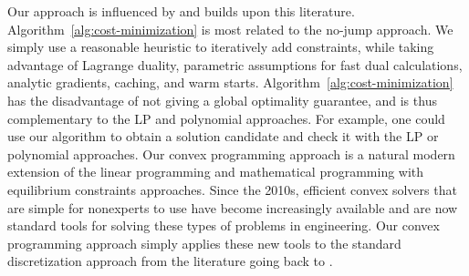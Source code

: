 Our approach is influenced by and builds upon this literature. Algorithm~\ref{alg:cost-minimization} is most related to the no-jump approach. We simply use a reasonable heuristic to iteratively add constraints, while taking advantage of Lagrange duality, parametric assumptions for fast dual calculations, analytic gradients, caching, and warm starts. Algorithm~\ref{alg:cost-minimization} has the disadvantage of not giving a global optimality guarantee, and is thus complementary to the LP and polynomial approaches. For example, one could use our algorithm to obtain a solution candidate and check it with the LP or polynomial approaches. Our convex programming approach is a natural modern extension of the linear programming and mathematical programming with equilibrium constraints approaches. Since the 2010s, efficient convex solvers that are simple for nonexperts to use have become increasingly available and are now standard tools for solving these types of problems in engineering. Our convex programming approach simply applies these new tools to the standard discretization approach from the literature going back to \textcite{grossman1983}.